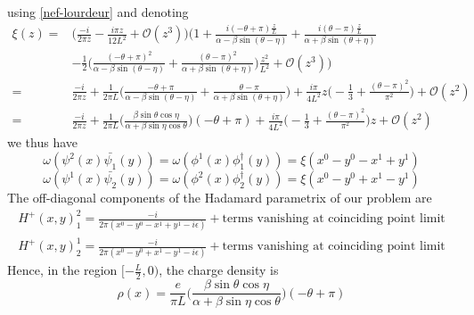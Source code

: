 using \cref{nef-lourdeur} and denoting
\begin{equation}\label{nef-xi}
\begin{split}
\xi(z) = & \Big( \frac{-i}{2 \pi z} - \frac{i \pi z}{12L^2} + \mathcal{O}(z^3) \Big)
\Big( 1 + \frac{i(-\theta + \pi)\frac{z}{L}}{\alpha - \beta\sin(\theta - \eta)} + \frac{i(\theta - \pi)\frac{z}{L}}{\alpha + \beta\sin(\theta + \eta)}  \\
& - \frac{1}{2}\Big(\frac{(-\theta + \pi)^2}{\alpha - \beta \sin (\theta - \eta)}  
+ \frac{(\theta - \pi)^2}{\alpha + \beta \sin (\theta + \eta)} \Big)\frac{z^2}{L^2}
+  \mathcal{O}(z^3) \Big)  \\
= & \frac{-i}{2 \pi z} + \frac{1}{2\pi L}\Big( \frac{-\theta + \pi}{\alpha - \beta\sin(\theta - \eta)} + \frac{\theta - \pi}{\alpha + \beta\sin(\theta + \eta)} \Big)  
 + \frac{i\pi}{4 L^2}z \big( -\frac{1}{3} + \frac{(\theta - \pi)^2}{\pi^2}\big) + \mathcal{O}(z^2) \\
= &  \frac{-i}{2 \pi z} 
+ \frac{1}{2\pi L}\Big( \frac{\beta \sin \theta \cos \eta}{\alpha + \beta \sin \eta \cos \theta}\Big) (-\theta + \pi) 
+ \frac{i\pi}{4 L^2}\big( -\frac{1}{3} + \frac{(\theta - \pi)^2}{\pi^2}\big)z+ \mathcal{O}(z^2)
\end{split}
\end{equation}
we thus have
\begin{equation*}
\omega(\psi^2(x) \bar{\psi_1}(y)) = \omega(\phi^1(x) \phi^\dagger_1(y)) 
= \xi( x^0 - y^0 - x^1 +y^1)
\end{equation*}
\begin{equation*}
\omega(\psi^1(x) \bar{\psi_2}(y)) =  \omega(\phi^2(x) \phi^\dagger_2(y)) 
= \xi(x^0 - y^0 + x^1 -y^1)
\end{equation*}
The off-diagonal components of the Hadamard parametrix of our problem are~\cite{Zahn2015}
\begin{equation*}
\begin{split}
H^{+} (x,y)^2_1 = \frac{-i}{2\pi (x^0 - y^0 - x^1 + y^1 -i\epsilon)} + \textrm{terms vanishing at coinciding point limit}  \\
H^{+} (x,y)^1_2 = \frac{-i}{2\pi (x^0 - y^0 + x^1 - y^1 -i\epsilon)} + \textrm{terms vanishing at coinciding point limit} 
\end{split}
\end{equation*}
Hence, in the region $[-\frac{L}{2}, 0)$, the charge density is
\begin{equation}
\rho(x) = \frac{e}{\pi L}\Big( \frac{\beta \sin \theta \cos \eta}{\alpha + \beta \sin \eta \cos \theta}\Big) (-\theta + \pi)
\end{equation}
